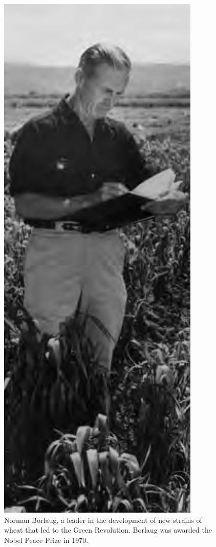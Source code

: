 \documentclass[11pt,ignorenonframetext,aspectratio=169]{beamer}
\begin{document}
\begin{frame}{}
\begin{columns}[T,onlytextwidth]
\end{columns}
\end{frame}

\begin{frame}{}
\protect\hypertarget{section-1}{}
\begin{columns}[T,onlytextwidth]
  

\begin{figure}
\includegraphics[width=0.38\linewidth]{../images/green_revolution_borlaug} \caption{Norman Borlaug, a leader in the development of new strains of wheat that led to the Green Revolution. Borlaug was awarded the Nobel Peace Prize in 1970.}\label{fig:green-revolution-borlaug}
\end{figure}



\end{columns}
\end{frame}
\end{document}
